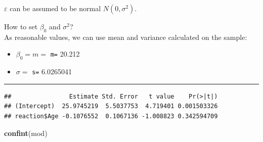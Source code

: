 \documentclass[]{article}
\newenvironment{Shaded}{\begin{snugshade}}{\end{snugshade}}
\newcommand{\CommentTok}[1]{\textcolor[rgb]{0.56,0.35,0.01}{\textit{#1}}}
\newcommand{\KeywordTok}[1]{\textcolor[rgb]{0.13,0.29,0.53}{\textbf{#1}}}
\newcommand{\NormalTok}[1]{#1}
\newcommand{\OperatorTok}[1]{\textcolor[rgb]{0.81,0.36,0.00}{\textbf{#1}}}
\providecommand{\tightlist}{%
  \setlength{\itemsep}{0pt}\setlength{\parskip}{0pt}}
\begin{document}
\(\varepsilon\) can be assumed to be normal \(N(0,\sigma^2)\).

How to set \(\beta_0\) and \(\sigma^2\)?\\
As reasonable values, we can use mean and variance calculated on the
sample:

\begin{Shaded}
\end{Shaded}

\begin{itemize}
\tightlist
\item
  \(\beta_0=m=\) \texttt{m=} 20.212
\item
  \(\sigma=\) \texttt{s=} 6.0265041
\end{itemize}

\begin{center}\rule{0.5\linewidth}{\linethickness}\end{center}

\begin{Shaded}
\end{Shaded}

\begin{verbatim}
##                Estimate Std. Error   t value    Pr(>|t|)
## (Intercept)  25.9745219  5.5037753  4.719401 0.001503326
## reaction$Age -0.1076552  0.1067136 -1.008823 0.342594709
\end{verbatim}

\begin{Shaded}
\begin{Highlighting}[]
\KeywordTok{confint}\NormalTok{(mod)}
\end{Highlighting}
\end{Shaded}
\end{document}
